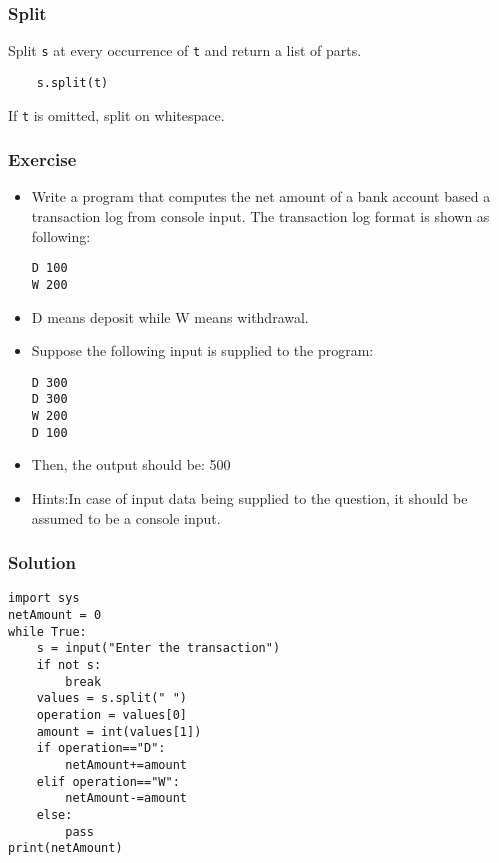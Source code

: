 



\begin{frame}[fragile]\frametitle{Split}
    Split \texttt{s} at every occurrence of \texttt{t} and return a list of parts. 
  \begin{lstlisting}
  	s.split(t)
  \end{lstlisting}
 If \texttt{t} is omitted, split on whitespace.
\end{frame}

\begin{frame}[fragile]\frametitle{Exercise}
  \begin{itemize}
  \item Write a program that computes the net amount of a bank account based a transaction log from console input. The transaction log format is shown as following:
    \begin{lstlisting}
D 100
W 200
  \end{lstlisting}
  \item D means deposit while W means withdrawal.
  \item Suppose the following input is supplied to the program:
    \begin{lstlisting}
D 300
D 300
W 200
D 100
  \end{lstlisting}
  \item Then, the output should be: 500
  \item  Hints:In case of input data being supplied to the question, it should be assumed to be a console input.
  \end{itemize}  
\end{frame}

\begin{frame}[fragile]\frametitle{Solution}
  \begin{lstlisting}
import sys
netAmount = 0
while True:
    s = input("Enter the transaction")
    if not s:
        break
    values = s.split(" ")
    operation = values[0]
    amount = int(values[1])
    if operation=="D":
        netAmount+=amount
    elif operation=="W":
        netAmount-=amount
    else:
        pass
print(netAmount)
  \end{lstlisting}
\end{frame}



